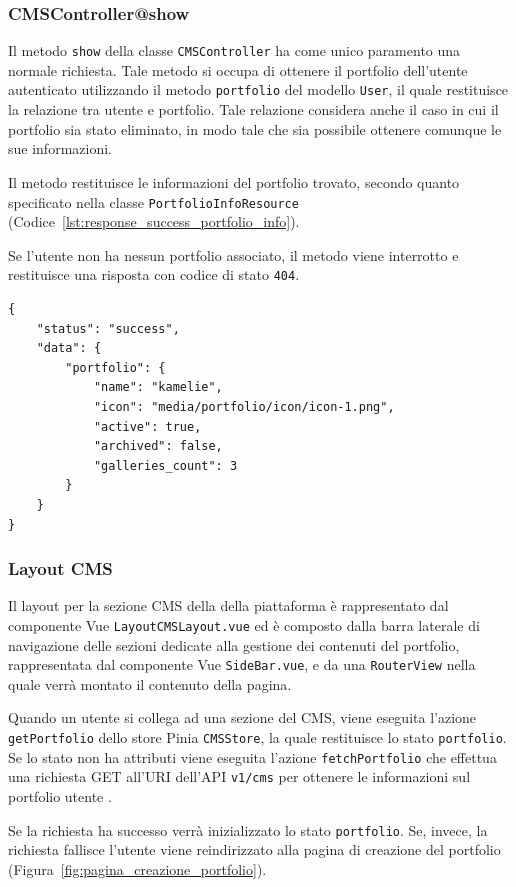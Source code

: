 \subsubsection{CMSController@show}
Il metodo \verb|show| della classe \verb|CMSController| ha come unico paramento una normale richiesta. Tale metodo si occupa di ottenere il portfolio dell'utente autenticato utilizzando il metodo \verb|portfolio| del modello \verb|User|, il quale restituisce la relazione tra utente e portfolio. Tale relazione considera anche il caso in cui il portfolio sia stato eliminato, in modo tale che sia possibile ottenere comunque le sue informazioni.


Il metodo restituisce le informazioni del portfolio trovato, secondo quanto specificato nella classe \verb|PortfolioInfoResource| (Codice~\ref{lst:response_success_portfolio_info}).

Se l'utente non ha nessun portfolio associato, il metodo viene interrotto e restituisce una risposta con codice di stato \verb|404|.

\begin{lstlisting}[caption={Risposta di successo visualizzazione del portfolio utente}, label={lst:response_success_portfolio_info}]
{
	"status": "success",
	"data": {
		"portfolio": {
			"name": "kamelie",
			"icon": "media/portfolio/icon/icon-1.png",
			"active": true,
			"archived": false,
			"galleries_count": 3
		}
	}
}
\end{lstlisting}

\subsubsection{Layout CMS}
Il layout per la sezione CMS della della piattaforma \`e rappresentato dal componente Vue \verb|LayoutCMSLayout.vue| ed \`e composto dalla barra laterale di navigazione delle sezioni dedicate alla gestione dei contenuti del portfolio, rappresentata dal componente Vue \verb|SideBar.vue|, e da una \verb|RouterView| nella quale verr\`a montato il contenuto della pagina.

Quando un utente si collega ad una sezione del CMS, viene eseguita l'azione \verb|getPortfolio| dello store Pinia \verb|CMSStore|, la quale restituisce lo stato \verb|portfolio|. Se lo stato non ha attributi viene eseguita l'azione \verb|fetchPortfolio| che effettua una richiesta GET all'URI dell'API \verb|v1/cms| per ottenere le informazioni sul portfolio utente .

Se la richiesta ha successo verr\`a inizializzato lo stato \verb|portfolio|. Se, invece, la richiesta fallisce l'utente viene reindirizzato alla pagina di creazione del portfolio (Figura~\ref{fig:pagina_creazione_portfolio}).

